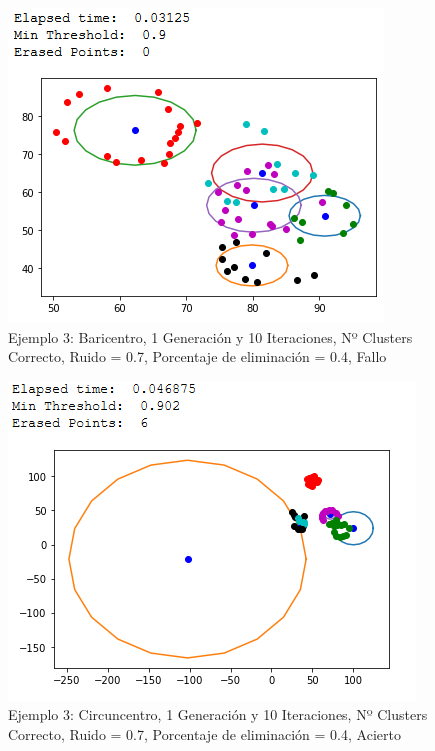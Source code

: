 \documentclass[conference,a4paper]{IEEEtran}
\begin{document}
\begin{figure}[H]
\centering
\includegraphics[scale=0.65]{Experimentacion/Ejemplo2/ej2_b_1_10_re_wrong}
\caption{Ejemplo 3: Baricentro, 1 Generación y 10 Iteraciones,  Nº Clusters Correcto, Ruido = 0.7, Porcentaje de eliminación = 0.4, Fallo\\}
\end{figure}

\begin{figure}[H]
\centering
\includegraphics[scale=0.65]{Experimentacion/Ejemplo3/ej3_c_1_10_re_wrong}
\caption{Ejemplo 3: Circuncentro, 1 Generación y 10 Iteraciones,  Nº Clusters Correcto, Ruido = 0.7, Porcentaje de eliminación = 0.4, Acierto\\}
\end{figure}
\end{document}
